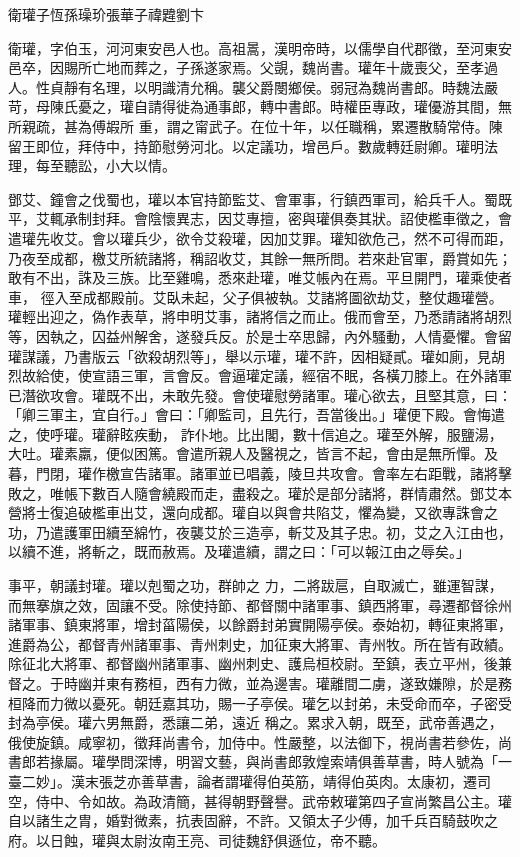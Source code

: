 
\begin{pinyinscope}

 衛瓘子恆孫璪玠張華子禕韙劉卞



 衛瓘，字伯玉，河河東安邑人也。高祖暠，漢明帝時，以儒學自代郡徵，至河東安邑卒，因賜所亡地而葬之，子孫遂家焉。父覬，魏尚書。瓘年十歲喪父，至孝過人。性貞靜有名理，以明識清允稱。襲父爵閿鄉侯。弱冠為魏尚書郎。時魏法嚴苛，母陳氏憂之，瓘自請得徙為通事郎，轉中書郎。時權臣專政，瓘優游其間，無所親疏，甚為傅嘏所
 重，謂之甯武子。在位十年，以任職稱，累遷散騎常侍。陳留王即位，拜侍中，持節慰勞河北。以定議功，增邑戶。數歲轉廷尉卿。瓘明法理，每至聽訟，小大以情。



 鄧艾、鐘會之伐蜀也，瓘以本官持節監艾、會軍事，行鎮西軍司，給兵千人。蜀既平，艾輒承制封拜。會陰懷異志，因艾專擅，密與瓘俱奏其狀。詔使檻車徵之，會遣瓘先收艾。會以瓘兵少，欲令艾殺瓘，因加艾罪。瓘知欲危己，然不可得而距，乃夜至成都，檄艾所統諸將，稱詔收艾，其餘一無所問。若來赴官軍，爵賞如先；敢有不出，誅及三族。比至雞鳴，悉來赴瓘，唯艾帳內在焉。平旦開門，瓘乘使者車，
 徑入至成都殿前。艾臥未起，父子俱被執。艾諸將圖欲劫艾，整仗趣瓘營。瓘輕出迎之，偽作表草，將申明艾事，諸將信之而止。俄而會至，乃悉請諸將胡烈等，因執之，囚益州解舍，遂發兵反。於是士卒思歸，內外騷動，人情憂懼。會留瓘謀議，乃書版云「欲殺胡烈等」，舉以示瓘，瓘不許，因相疑貳。瓘如廁，見胡烈故給使，使宣語三軍，言會反。會逼瓘定議，經宿不眠，各橫刀膝上。在外諸軍已潛欲攻會。瓘既不出，未敢先發。會使瓘慰勞諸軍。瓘心欲去，且堅其意，曰：「卿三軍主，宜自行。」會曰：「卿監司，且先行，吾當後出。」瓘便下殿。會悔遣之，使呼瓘。瓘辭眩疾動，
 詐仆地。比出閣，數十信追之。瓘至外解，服鹽湯，大吐。瓘素羸，便似困篤。會遣所親人及醫視之，皆言不起，會由是無所憚。及暮，門閉，瓘作檄宣告諸軍。諸軍並已唱義，陵旦共攻會。會率左右距戰，諸將擊敗之，唯帳下數百人隨會繞殿而走，盡殺之。瓘於是部分諸將，群情肅然。鄧艾本營將士復追破檻車出艾，還向成都。瓘自以與會共陷艾，懼為變，又欲專誅會之功，乃遣護軍田續至綿竹，夜襲艾於三造亭，斬艾及其子忠。初，艾之入江由也，以續不進，將斬之，既而赦焉。及瓘遣續，謂之曰：「可以報江由之辱矣。」



 事平，朝議封瓘。瓘以剋蜀之功，群帥之
 力，二將跋扈，自取滅亡，雖運智謀，而無搴旗之效，固讓不受。除使持節、都督關中諸軍事、鎮西將軍，尋遷都督徐州諸軍事、鎮東將軍，增封菑陽侯，以餘爵封弟實開陽亭侯。泰始初，轉征東將軍，進爵為公，都督青州諸軍事、青州刺史，加征東大將軍、青州牧。所在皆有政績。除征北大將軍、都督幽州諸軍事、幽州刺史、護烏桓校尉。至鎮，表立平州，後兼督之。于時幽并東有務桓，西有力微，並為邊害。瓘離間二虜，遂致嫌隙，於是務桓降而力微以憂死。朝廷嘉其功，賜一子亭侯。瓘乞以封弟，未受命而卒，子密受封為亭侯。瓘六男無爵，悉讓二弟，遠近
 稱之。累求入朝，既至，武帝善遇之，俄使旋鎮。咸寧初，徵拜尚書令，加侍中。性嚴整，以法御下，視尚書若參佐，尚書郎若掾屬。瓘學問深博，明習文藝，與尚書郎敦煌索靖俱善草書，時人號為「一臺二妙」。漢末張芝亦善草書，論者謂瓘得伯英筋，靖得伯英肉。太康初，遷司空，侍中、令如故。為政清簡，甚得朝野聲譽。武帝敕瓘第四子宣尚繁昌公主。瓘自以諸生之胄，婚對微素，抗表固辭，不許。又領太子少傅，加千兵百騎鼓吹之府。以日蝕，瓘與太尉汝南王亮、司徒魏舒俱遜位，帝不聽。




\end{pinyinscope}
